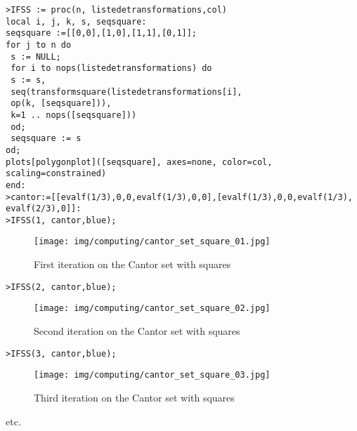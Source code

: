   	\texttt{>IFSS := proc(n, liste\textunderscore de\textunderscore transformations,col)}\\
  	\texttt{local i, j, k, s, seq\textunderscore square:}\\
     \texttt{seq\textunderscore square :=[[0,0],[1,0],[1,1],[0,1]];} \\
     \texttt{for j to n do}\\
     \texttt{   s := NULL;}\\   
     \texttt{   for i to nops(liste\textunderscore de\textunderscore transformations) do}\\
        \texttt{       {} {} {} s := s,}\\
        \texttt{      {} {} {} seq(transform\textunderscore square(liste\textunderscore de\textunderscore transformations[i],}\\
        \texttt{      {} {} {} op(k, [seq\textunderscore square])),}\\
        \texttt{      {} {} {} k=1 .. nops([seq\textunderscore square]))}\\
      \texttt{   od;}\\
      \texttt{   seq\textunderscore square := s}\\
    \texttt{od;}\\
    \texttt{plots[polygonplot]([seq\textunderscore square], axes=none, color=col, scaling=constrained)}\\
    \texttt{end:}\\
    
	\texttt{>cantor:=[[evalf(1/3),0,0,evalf(1/3),0,0],[evalf(1/3),0,0,evalf(1/3), evalf(2/3),0]]:}\\
	
	\texttt{>IFSS(1, cantor,blue);}
	\begin{figure}[H]
		\centering
		\texttt{[image: img/computing/cantor\_set\_square\_01.jpg]}
		\caption[]{First iteration on the Cantor set with squares}
	\end{figure}
	\texttt{>IFSS(2, cantor,blue);}
	\begin{figure}[H]
		\centering
		\texttt{[image: img/computing/cantor\_set\_square\_02.jpg]}
		\caption[]{Second iteration on the Cantor set with squares}
	\end{figure}
	\texttt{>IFSS(3, cantor,blue);}
	\begin{figure}[H]
		\centering
		\texttt{[image: img/computing/cantor\_set\_square\_03.jpg]}
		\caption[]{Third iteration on the Cantor set with squares}
	\end{figure}
	etc.
	
